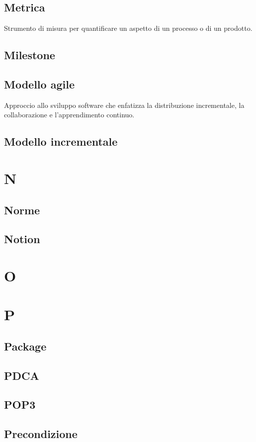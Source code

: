 \documentclass[12pt]{article}
\begin{document}
		\subsection{Metrica}
			Strumento di misura per quantificare un aspetto di un processo o di un prodotto.
		\subsection{Milestone}
		\subsection{Modello agile}
			Approccio allo sviluppo software che enfatizza la distribuzione incrementale, la collaborazione e l'apprendimento continuo.

		\subsection{Modello incrementale}

	\clearpage
	\section{N}
		\subsection{Norme}
		\subsection{Notion}
	\clearpage
	\section{O}
	\clearpage
	\section{P}
		\subsection{Package}
		\subsection{PDCA} %
		\subsection{POP3}
		\subsection{Precondizione}
\end{document}
